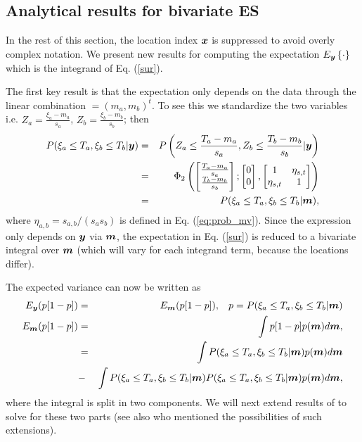\documentclass[aoas]{imsart}
\begin{document}
\subsection{Analytical results for bivariate ES}

In the rest of this section, the location index ${\boldsymbol x}$ is suppressed to avoid overly complex notation. We present new results for computing the expectation $E_{{\boldsymbol y}}\left\{ \cdot \right\}$ which is the integrand of Eq. (\ref{sur}).

The first key result is that the expectation only depends on the data through the linear combination $\bm=(m_{a},m_{b})^t$. 
To see this we standardize the two variables i.e.
$Z_a=\frac{\xi_a-m_{a}}{s_{a}}$,
$Z_b=\frac{\xi_b-m_{b}}{s_{b}}$; 
then
\begin{eqnarray}
   P(\xi_a \leq T_a, \xi_b \leq T_b|\by) &=& P \left( Z_a \leq\frac{T_a-m_{a}}{s_{a}}, Z_b \leq\frac{T_b-m_{b}}{s_{b}}|\by \right) \nonumber \\
   &=& \Phi_2 \begin{pmatrix} 
\begin{bmatrix} \frac{T_a-m_{a}}{s_{a}}\\
\frac{T_b-m_{b}}{s_{b}}
\end{bmatrix};
 \begin{bmatrix} 0\\
0
\end{bmatrix},\begin{bmatrix}
1 & \eta_{s,t}  \\
\eta_{s,t}   & 1  
\end{bmatrix}\end{pmatrix} \nonumber \\
&=& P(\xi_a \leq T_a, \xi_b \leq T_b|\bm),
\end{eqnarray}
where $\eta_{a,b} =s_{a,b}/(s_{a} s_{b})$ is defined in Eq. (\ref{eq:prob_mv}).
Since the expression only depends on ${\boldsymbol y}$ via ${\boldsymbol m}$, the expectation in Eq. (\ref{sur}) is reduced to a bivariate integral over ${\boldsymbol m}$ (which will vary for each integrand term, because the locations differ). 

The expected variance can now be written as
\begin{eqnarray}\label{eq:var2}
E_{\by}(p[1-p]) &=& E_{\bm}(p[1-p]), \hspace{3mm} p=P(\xi_a \leq T_a, \xi_b \leq T_b|\bm) \nonumber \\
E_{\bm}(p[1-p]) & = & \int p[1-p] p(\bm) d\bm, \nonumber \\
 &=& \int P(\xi_a \leq T_a, \xi_b \leq T_b|\bm)  p(\bm) d\bm \nonumber  \\
&-& \int P(\xi_a \leq T_a, \xi_b \leq T_b|\bm) P(\xi_a \leq T_a, \xi_b \leq T_b|\bm) p(\bm) d\bm, 
\end{eqnarray}
where the integral is split in two components.
We will next extend results of \cite{chevalier2014fast} to solve for these two parts (see also \cite{stroh} who mentioned the possibilities of such extensions). 
\end{document}
